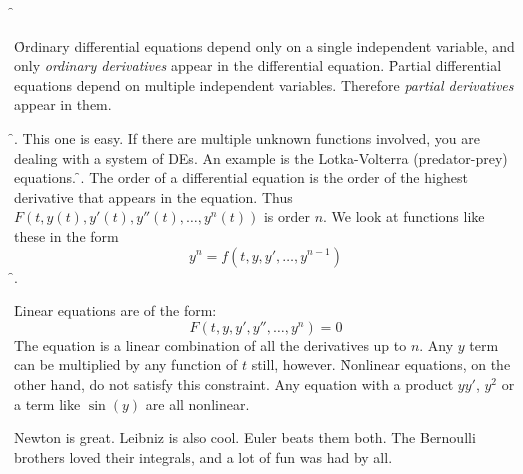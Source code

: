 \begin{itemize}
\f {}
	\begin{itemize}
	\f Ordinary differential equations depend only on a single independent variable, and only \emph{ordinary derivatives} appear in the differential equation.
	\f Partial differential equations depend on multiple independent variables. Therefore \emph{partial derivatives} appear in them.
	\end{itemize}
\f {}. 
	This one is easy. If there are multiple unknown functions involved, you are dealing with a system of DEs. An example is the Lotka-Volterra (predator-prey) equations.
\f {}. The order of a differential equation is the order of the highest derivative that appears in the equation. Thus
$F(t, y(t), y'(t), y''(t), \ldots , y^n(t)) $
is order $n$. We look at functions like these in the form 
	\begin{equation} y^n = f(t, y, y', \ldots, y^{n-1})
	\end{equation}
\f {}. 
	\begin{itemize}
	\f Linear equations are of the form: 
		$$ F(t, y, y', y'',\ldots , y^n) = 0$$
		The equation is a linear combination of all the derivatives up to $n$. Any $y$ term can be multiplied by any function of $t$ still, however. 
	\f Nonlinear equations, on the other hand, do not satisfy this constraint. Any equation with a product $yy'$, $y^2$ or a term like $\sin (y)$ are all nonlinear. 
	\end{itemize}
\end{itemize}

Newton is great. Leibniz is also cool. Euler beats them both. The Bernoulli brothers loved their integrals, and a lot of fun was had by all.